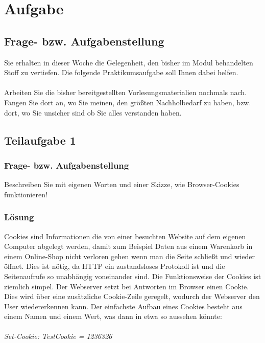 \newcommand{\env}[1]{\texttt{#1}}
\newcommand{\command}[1]{\texttt{#1}}
\newcommand{\package}[1]{\texttt{\itshape#1}}
\newcommand{\engl}[1]{(engl: \textit{#1})\xspace}
\setlength{\parindent}{0pt}
\lstset{extendedchars=\true}
\lstset{inputencoding=ansinew}
\newcommand\tab[1][1cm]{\hspace*{#1}}
\newpage

\section{Aufgabe}

\subsection{Frage- bzw. Aufgabenstellung}

Sie erhalten in dieser Woche die Gelegenheit, den bisher im Modul behandelten Stoff zu vertiefen.
Die folgende Praktikumsaufgabe soll Ihnen dabei helfen. \\
\\
Arbeiten Sie die bisher bereitgestellten Vorlesungsmaterialien nochmals nach. Fangen Sie dort
an, wo Sie meinen, den größten Nachholbedarf zu haben, bzw. dort, wo Sie unsicher sind ob
Sie alles verstanden haben.

\subsection{Teilaufgabe 1}

\subsubsection{Frage- bzw. Aufgabenstellung}
Beschreiben Sie mit eigenen Worten und einer Skizze, wie Browser-Cookies funktionieren!

\subsubsection{Lösung}\cite{[1]}
Cookies sind Informationen die von einer besuchten Website auf dem eigenen Computer abgelegt werden, damit zum Beispiel Daten aus einem Warenkorb in einem Online-Shop nicht verloren gehen wenn man die Seite schließt und wieder öffnet. Dies ist nötig, da HTTP ein zustandsloses Protokoll ist und die Seitenaufrufe so unabhängig voneinander sind. Die Funktionsweise der Cookies ist ziemlich simpel. Der Webserver setzt bei Antworten im Browser einen Cookie. Dies wird über eine zusätzliche Cookie-Zeile geregelt, wodurch der Webserver den User wiedererkennen kann. Der einfachste Aufbau eines Cookies besteht aus einem Namen und einem Wert, was dann in etwa so aussehen könnte: \\
\\
\textit{Set-Cookie: TestCookie = 1236326}


